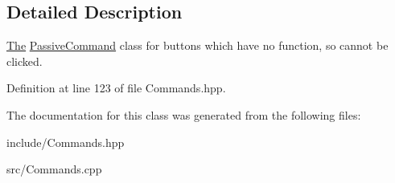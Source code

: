 \subsection{Detailed Description}
\hyperlink{namespace_the}{The} \hyperlink{class_passive_command}{Passive\+Command} class for buttons which have no function, so cannot be clicked. 

Definition at line 123 of file Commands.\+hpp.



The documentation for this class was generated from the following files\+:\begin{DoxyCompactItemize}
\item 
include/Commands.\+hpp\item 
src/Commands.\+cpp\end{DoxyCompactItemize}
